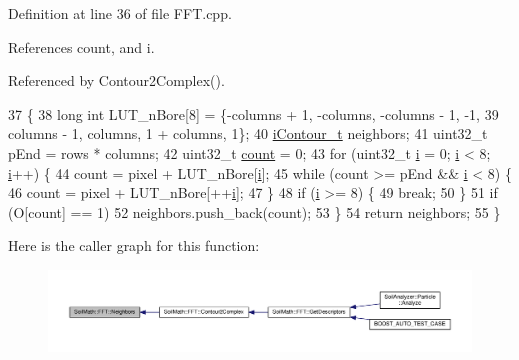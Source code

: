Definition at line 36 of file F\+F\+T.\+cpp.



References count, and i.



Referenced by Contour2\+Complex().


\begin{DoxyCode}
37                                          \{
38   \textcolor{keywordtype}{long} \textcolor{keywordtype}{int} LUT\_nBore[8] = \{-columns + 1, -columns, -columns - 1, -1,
39                            columns - 1,  columns,  1 + columns,  1\};
40   \hyperlink{_soil_math_types_8h_a1ade796add2f13888dfa9e6bde0bdc37}{iContour\_t} neighbors;
41   uint32\_t pEnd = rows * columns;
42   uint32\_t \hyperlink{_comparision_pictures_2_createtest_image_8m_ae11b3deb3de3df7dc48e439074023e35}{count} = 0;
43   \textcolor{keywordflow}{for} (uint32\_t \hyperlink{_comparision_pictures_2_createtest_image_8m_a6f6ccfcf58b31cb6412107d9d5281426}{i} = 0; \hyperlink{_comparision_pictures_2_createtest_image_8m_a6f6ccfcf58b31cb6412107d9d5281426}{i} < 8; \hyperlink{_comparision_pictures_2_createtest_image_8m_a6f6ccfcf58b31cb6412107d9d5281426}{i}++) \{
44     count = pixel + LUT\_nBore[\hyperlink{_comparision_pictures_2_createtest_image_8m_a6f6ccfcf58b31cb6412107d9d5281426}{i}];
45     \textcolor{keywordflow}{while} (count >= pEnd && \hyperlink{_comparision_pictures_2_createtest_image_8m_a6f6ccfcf58b31cb6412107d9d5281426}{i} < 8) \{
46       count = pixel + LUT\_nBore[++\hyperlink{_comparision_pictures_2_createtest_image_8m_a6f6ccfcf58b31cb6412107d9d5281426}{i}];
47     \}
48     \textcolor{keywordflow}{if} (\hyperlink{_comparision_pictures_2_createtest_image_8m_a6f6ccfcf58b31cb6412107d9d5281426}{i} >= 8) \{
49       \textcolor{keywordflow}{break};
50     \}
51     \textcolor{keywordflow}{if} (O[count] == 1)
52       neighbors.push\_back(count);
53   \}
54   \textcolor{keywordflow}{return} neighbors;
55 \}
\end{DoxyCode}


Here is the caller graph for this function\+:\nopagebreak
\begin{figure}[H]
\begin{center}
\leavevmode
\includegraphics[width=350pt]{class_soil_math_1_1_f_f_t_a45b32ad009154112d2fc4e467fc7c5ac_icgraph}
\end{center}
\end{figure}




